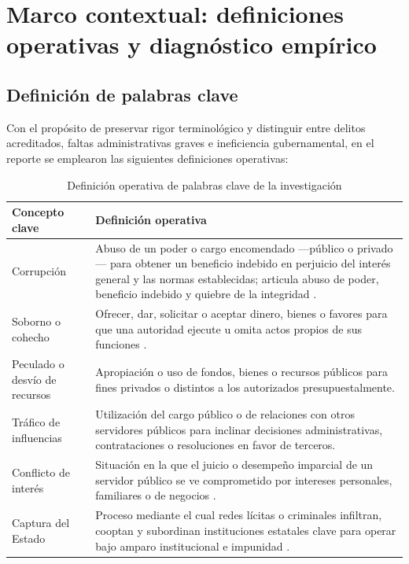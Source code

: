 \section{Marco contextual: definiciones operativas y diagnóstico empírico}

\subsection{Definición de palabras clave}

Con el propósito de preservar rigor terminológico y distinguir entre delitos acreditados, faltas administrativas graves e ineficiencia gubernamental, en el reporte se emplearon las siguientes definiciones operativas:

\begin{table}[H]
\centering
\caption{Definición operativa de palabras clave de la investigación}
\label{tab:definiciones}
\small
\begin{tabular}{@{}p{3.5cm}p{10cm}@{}}
\toprule
\textbf{Concepto clave} & \textbf{Definición operativa} \\
\midrule
Corrupción & Abuso de un poder o cargo encomendado ---público o privado--- para obtener un beneficio indebido en perjuicio del interés general y las normas establecidas; articula abuso de poder, beneficio indebido y quiebre de la integridad \citep{transparencia2026,inegi2016}. \\
\addlinespace
Soborno o cohecho & Ofrecer, dar, solicitar o aceptar dinero, bienes o favores para que una autoridad ejecute u omita actos propios de sus funciones \citep{unodc2003}. \\
\addlinespace
Peculado o desvío de recursos & Apropiación o uso de fondos, bienes o recursos públicos para fines privados o distintos a los autorizados presupuestalmente. \\
\addlinespace
Tráfico de influencias & Utilización del cargo público o de relaciones con otros servidores públicos para inclinar decisiones administrativas, contrataciones o resoluciones en favor de terceros. \\
\addlinespace
Conflicto de interés & Situación en la que el juicio o desempeño imparcial de un servidor público se ve comprometido por intereses personales, familiares o de negocios \citep{lomnitz2000}. \\
\addlinespace
Captura del Estado & Proceso mediante el cual redes lícitas o criminales infiltran, cooptan y subordinan instituciones estatales clave para operar bajo amparo institucional e impunidad \citep{merino2024,vazquezvalencia2019}. \\

\end{tabular}
\end{table}

